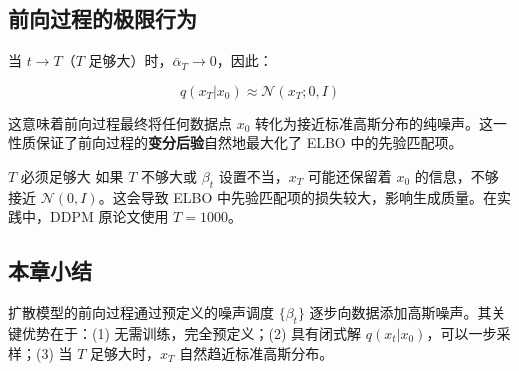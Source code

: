 \subsection{前向过程的极限行为}

当 $t \to T$（$T$ 足够大）时，$\bar{\alpha}_T \to 0$，因此：

$$q(x_T | x_0) \approx \mathcal{N}(x_T; 0, I)$$

这意味着前向过程最终将任何数据点 $x_0$ 转化为接近标准高斯分布的纯噪声。这一性质保证了前向过程的\textbf{变分后验}自然地最大化了 ELBO 中的先验匹配项。

\begin{warningbox}{$T$ 必须足够大}
如果 $T$ 不够大或 $\beta_t$ 设置不当，$x_T$ 可能还保留着 $x_0$ 的信息，不够接近 $\mathcal{N}(0, I)$。这会导致 ELBO 中先验匹配项的损失较大，影响生成质量。在实践中，DDPM 原论文使用 $T = 1000$。
\end{warningbox}

\subsection{本章小结}

扩散模型的前向过程通过预定义的噪声调度 $\{\beta_t\}$ 逐步向数据添加高斯噪声。其关键优势在于：(1) 无需训练，完全预定义；(2) 具有闭式解 $q(x_t|x_0)$，可以一步采样；(3) 当 $T$ 足够大时，$x_T$ 自然趋近标准高斯分布。


